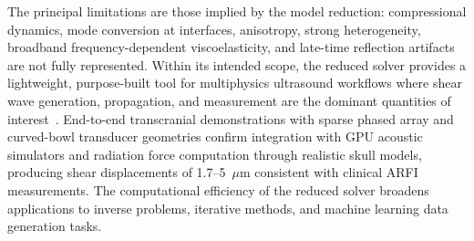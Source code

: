 \documentclass{iopjournal}
\begin{document}
The principal limitations are those implied by the model reduction: compressional
dynamics, mode conversion at interfaces, anisotropy, strong heterogeneity,
broadband frequency-dependent viscoelasticity, and late-time reflection
artifacts are not fully represented. Within its intended scope, the reduced
solver provides a lightweight, purpose-built tool for multiphysics ultrasound
workflows where shear wave generation, propagation, and measurement are the
dominant quantities of
interest~\cite{sarvazyan1998elasticity,bercoff2004supersonic,barr2015elastography,nightingale2002radiation,tanter2008quantitative}.
End-to-end transcranial demonstrations with sparse phased array and
curved-bowl transducer geometries confirm integration with GPU acoustic
simulators and radiation force computation through realistic skull models,
producing shear displacements of 1.7--5~$\mu$m consistent with clinical ARFI
measurements. The computational efficiency of the reduced solver broadens
applications to inverse problems, iterative methods, and machine learning data
generation tasks.










\end{document}
